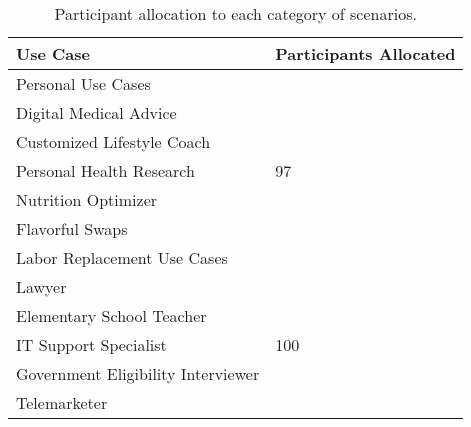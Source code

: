 \begin{table}[!hbpt]
    \centering
    \small
    \begin{tabularx}{0.4\linewidth}{l|X}
    \toprule
       Use Case & Participants Allocated \\
    \midrule
       Personal Use Cases & \\
    \midrule
       Digital Medical Advice & \multirow{5}{*}{97} \\
       Customized Lifestyle Coach & \\
       Personal Health Research & \\
       Nutrition Optimizer & \\
       Flavorful Swaps & \\
    \midrule
       Labor Replacement Use Cases & \\
    \midrule
       Lawyer & \multirow{5}{*}{100} \\
       Elementary School Teacher & \\
       IT Support Specialist & \\
       Government Eligibility Interviewer & \\
       Telemarketer & \\
    \bottomrule
    \end{tabularx}
    \caption{Participant allocation to each category of scenarios.}
    \label{tab:study1-use-case}
\end{table}